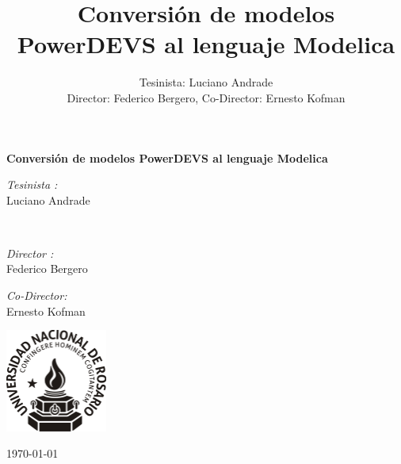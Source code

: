 \documentclass[a4paper,	11pt]{report}
\begin{document}
\renewcommand\floatpagefraction{.9}
\renewcommand\topfraction{.9}
\renewcommand\bottomfraction{.9}
\renewcommand\textfraction{.1}
\setcounter{totalnumber}{50}
\setcounter{topnumber}{50}
\setcounter{bottomnumber}{50}

\title{Conversión de modelos PowerDEVS al lenguaje Modelica}
\author{Tesinista: Luciano Andrade \\ Director: Federico Bergero, Co-Director: Ernesto Kofman} 


\begin{titlepage}
\begin{center}

\huge \bfseries Conversión de modelos PowerDEVS al lenguaje Modelica

\vfill

\begin{minipage}[t]{0.4\textwidth}
\begin{flushleft} \large
\emph{Tesinista :}\\
Luciano Andrade
\end{flushleft}
\end{minipage}\\ 
\vfill
\begin{minipage}[t]{0.4\textwidth}
\begin{flushleft} \large
\emph{Director :}\\
Federico Bergero
\end{flushleft}
\end{minipage}%
\begin{minipage}[t]{0.4\textwidth}
\begin{flushright} \large
\emph{Co-Director:} \\
Ernesto Kofman 
\end{flushright}
\end{minipage}

\vfill

\includegraphics[width=0.25\textwidth]{logo-unr}

\vfill

{\large \today}
\end{center}
\end{titlepage}
\end{document}
